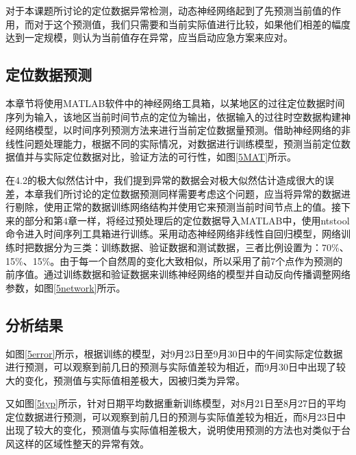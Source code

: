 \documentclass[a4paper,AutoFakeBold,oneside,12pt]{book}
\begin{document}
{{

	对于本课题所讨论的定位数据异常检测，动态神经网络起到了先预测当前值的作用，而对于这个预测值，我们只需要和当前实际值进行比较，如果他们相差的幅度达到一定规模，则认为当前值存在异常，应当启动应急方案来应对。

\subsection{定位数据预测}
	本章节将使用MATLAB软件中的神经网络工具箱，以某地区的过往定位数据时间序列为输入，该地区当前时间节点的定位为输出，依据输入的过往时空数据构建神经网络模型，以时间序列预测方法来进行当前定位数据量预测。借助神经网络的非线性问题处理能力，根据不同的实际情况，对数据进行训练模型，预测当前定位数据值并与实际定位数据对比，验证方法的可行性，如图\ref{5MAT}所示。


	在4.2的极大似然估计中，我们提到异常的数据会对极大似然估计造成很大的误差，本章我们所讨论的定位数据预测同样需要考虑这个问题，应当将异常的数据进行剔除，使用正常的数据训练网络结构并使用它来预测当前时间节点上的值。接下来的部分和第4章一样，将经过预处理后的定位数据导入MATLAB中，使用ntstool命令进入时间序列工具箱进行训练。采用动态神经网络非线性自回归模型，网络训练时把数据分为三类：训练数据、验证数据和测试数据，三者比例设置为：70\%、15\%、15\%。由于每一个自然周的变化大致相似，所以采用了前7个点作为预测的前序值。通过训练数据和验证数据来训练神经网络的模型并自动反向传播调整网络参数，如图\ref{5network}所示。


\subsection{分析结果}
	如图\ref{5error}所示，根据训练的模型，对9月23日至9月30日中的午间实际定位数据进行预测，可以观察到前几日的预测与实际值差较为相近，而9月30日中出现了较大的变化，预测值与实际值相差极大，因被归类为异常。


	又如图\ref{5typ}所示，针对日期平均数据重新训练模型，对8月21日至8月27日的平均定位数据进行预测，可以观察到前几日的预测与实际值差较为相近，而8月23日中出现了较大的变化，预测值与实际值相差极大，说明使用预测的方法也对类似于台风这样的区域性整天的异常有效。

}}
\end{document}
